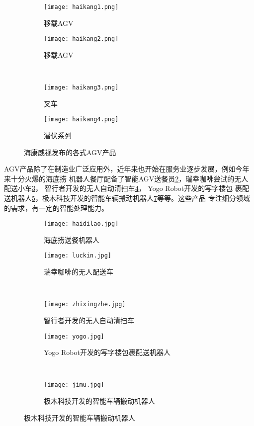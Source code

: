 \begin{figure}
\centering
\begin{subfigure}{.5\textwidth}
  \centering
  \texttt{[image: haikang1.png]}
  \caption{移载AGV}
\end{subfigure}%
\begin{subfigure}{.5\textwidth}
  \centering
  \texttt{[image: haikang2.png]}
  \caption{移载AGV}
\end{subfigure}%
\\
\begin{subfigure}{.5\textwidth}
  \centering
  \texttt{[image: haikang3.png]}
  \caption{叉车}
\end{subfigure}%
\begin{subfigure}{.5\textwidth}
  \centering
  \texttt{[image: haikang4.png]}
  \caption{潜伏系列}
\end{subfigure}%
\caption{海康威视发布的各式AGV产品}
\label{fig:haikang}
\end{figure}

AGV产品除了在制造业广泛应用外，近年来也开始在服务业逐步发展，例如今年来十分火爆的海底捞
机器人餐厅配备了智能AGV送餐员\ref{fig:haidilao}，瑞幸咖啡尝试的无人配送小车\ref{fig:luckin}，
智行者开发的无人自动清扫车\ref{fig:zhixingzhe}， Yogo Robot开发的写字楼包
裹配送机器人\ref{fig:yogo}，极木科技开发的智能车辆搬动机器人\ref{fig:jimu}等等。这些产品
专注细分领域的需求，有一定的智能处理能力。

\begin{figure}
\centering
\begin{subfigure}{.5\textwidth}
  \centering
  \texttt{[image: haidilao.jpg]}
  \caption{海底捞送餐机器人}
  \label{fig:haidilao}
\end{subfigure}%
\begin{subfigure}{.5\textwidth}
  \centering
  \texttt{[image: luckin.jpg]}
  \caption{瑞幸咖啡的无人配送车}
  \label{fig:luckin}
\end{subfigure}%
\\
\begin{subfigure}{.5\textwidth}
  \centering
  \texttt{[image: zhixingzhe.jpg]}
  \caption{智行者开发的无人自动清扫车}
  \label{fig:zhixingzhe}
\end{subfigure}%
\begin{subfigure}{.5\textwidth}
  \centering
  \texttt{[image: yogo.jpg]}
  \caption{Yogo Robot开发的写字楼包裹配送机器人}
  \label{fig:yogo}
\end{subfigure}%
\\
\begin{subfigure}{.5\textwidth}
  \centering
  \texttt{[image: jimu.jpg]}
  \caption{极木科技开发的智能车辆搬动机器人}
  \label{fig:jimu}
\end{subfigure}%
\end{figure}



